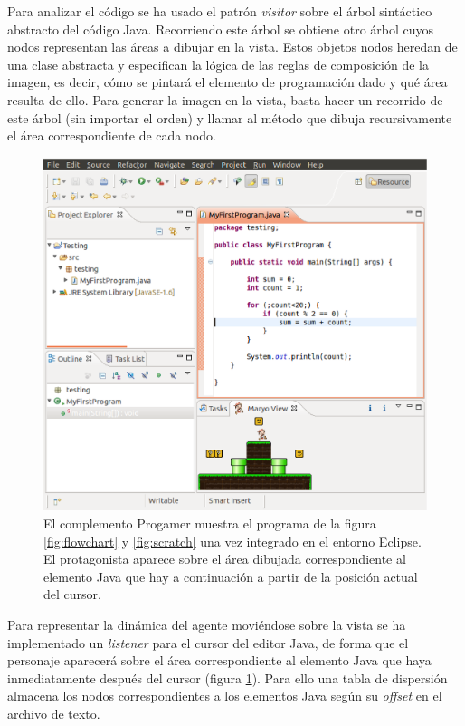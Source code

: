 \documentclass{llncs}
\begin{document}
Para analizar el código se ha usado el patrón \emph{visitor} sobre el árbol sintáctico abstracto del código Java. Recorriendo este árbol se obtiene otro árbol cuyos nodos representan las áreas a dibujar en la vista. Estos objetos nodos heredan de una clase abstracta y especifican la lógica de las reglas de composición de la imagen, es decir, cómo se pintará el elemento de programación dado y qué área resulta de ello. Para generar la imagen en la vista, basta hacer un recorrido de este árbol (sin importar el orden) y llamar al método que dibuja recursivamente el área correspondiente de cada nodo.

\begin{figure}[ht]
\begin{center}
\includegraphics[scale=0.5]{images/eclipse.eps}
\caption{El complemento Progamer muestra el programa de la figura \ref{fig:flowchart} y \ref{fig:scratch} una vez integrado en el entorno Eclipse. El protagonista aparece sobre el área dibujada correspondiente al elemento Java que hay a continuación a partir de la posición actual del cursor.
\label{fig:eclipse}}
\end{center}
\end{figure}

Para representar la dinámica del agente moviéndose sobre la vista se ha
implementado un {\em listener} para el cursor del editor Java, de forma que el personaje aparecerá sobre el área correspondiente al elemento Java que haya inmediatamente después del cursor (figura \ref{fig:eclipse}). Para ello una tabla de dispersión almacena los nodos correspondientes a los elementos Java según su {\em offset} en el archivo de texto.
\end{document}
